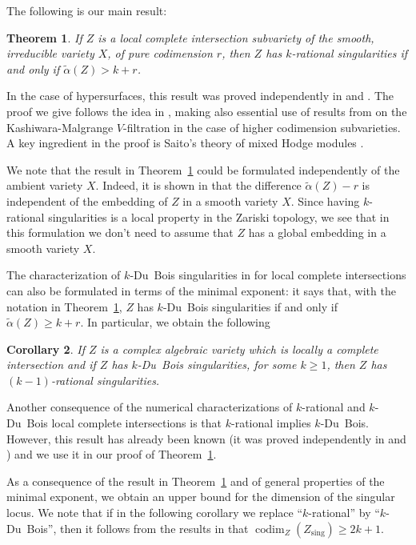 \documentclass[JEP,XML,SOM,Unicode]{cedram}
\theoremstyle{plain}
\newtheorem{thm}{Theorem}[section]
\newtheorem{cor}[thm]{Corollary}
\theoremstyle{definition}
\newcommand\sing{\mathrm{sing}}
\DeclareMathOperator{\codim}{codim}
\begin{document}
The following is our main result:

\begin{thm}\label{thm1_intro}
If $Z$ is a local complete intersection subvariety of the smooth, irreducible variety $X$, of pure codimension $r$, then $Z$ has $k$-rational singularities
if and only if $\widetilde{\alpha}(Z)>k+r$.
\end{thm}

In the case of hypersurfaces, this result was proved independently in \cite[App.]{FL2} and \cite{MP2}. The proof we give follows the idea in \cite[App.]{FL2},
making also essential use of results from \cite{CD} on the Kashiwara-Malgrange $V$-filtration in the case of higher codimension subvarieties. A key ingredient
in the proof is Saito's theory of mixed Hodge modules \cite{Saito_MHM}.

We note that the result in Theorem~\ref{thm1_intro} could be formulated independently of the ambient variety $X$. Indeed, it is shown in \cite[Prop.\,4.14]{CDMO}
that the difference $\widetilde{\alpha}(Z)-r$ is independent of the embedding of $Z$ in a smooth variety $X$. Since having $k$-rational singularities is a local property in the Zariski topology,
we see that in this formulation we don't need to assume that $Z$ has a global embedding in a smooth variety $X$.

The characterization of $k$-Du~Bois singularities in \cite{MP1} for local complete intersections can also be formulated in terms of the minimal exponent:
it says that, with the notation in Theorem~\ref{thm1_intro}, $Z$ has $k$-Du~Bois singularities if and only if $\widetilde{\alpha}(Z)\geq k+r$. In particular, we obtain the following

\begin{cor}\label{cor2_intro}
If $Z$ is a complex algebraic variety which is locally a complete intersection and if $Z$ has $k$-Du~Bois singularities, for some $k\geq 1$,
then $Z$ has $(k-1)$-rational singularities.
\end{cor}

Another consequence of the numerical characterizations of $k$-rational and $k$-Du~Bois local complete intersections
is that $k$-rational implies $k$-Du~Bois. However, this result has already been known (it was proved independently in \cite{FL2} and \cite{MP1})
and we use it in our proof of Theorem~\ref{thm1_intro}.

As a consequence of the result in Theorem~\ref{thm1_intro} and of general properties
of the minimal exponent, we obtain an upper bound for the dimension of the singular locus.
We note that if in the following corollary we replace ``$k$-rational'' by ``$k$-Du~Bois'', then it follows from the results in \cite{MP1}
that $\codim_Z(Z_\sing)\geq 2k+1$.
\end{document}
